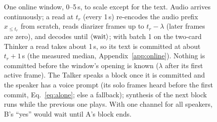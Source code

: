 \begin{figure}[t]
{}
\caption{One online window, 0--5\,s, to scale except for the text. Audio arrives continuously; a read at $t_r$ (every
1\,s) re-encodes the audio prefix $x_{\le t_r}$ from scratch, reads diarizer frames up to $t_r-\lambda$ (later frames are
zero), and decodes until $\langle\mathrm{wait}\rangle$; with batch 1 on the two-card Thinker a read takes about 1\,s, so its text is committed
at about $t_r+1$\,s (the measured median, Appendix~\ref{app:online}). Nothing is committed before the window's opening is
known ($\lambda$ after its first active frame). The Talker speaks a block once it is committed and the speaker has a voice
prompt (its solo frames heard before the first commit, Eq.~\ref{eq:alone}; else a fallback); synthesis of the next block runs
while the previous one plays. With one channel for all speakers, B's ``yes'' would wait until A's block ends.}
\label{fig:timeline}
\end{figure}
